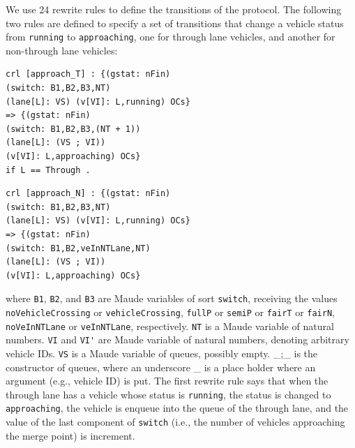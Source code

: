 \documentclass[10pt, conference, compsocconf]{IEEEtran}
\begin{document}
We use 24 rewrite rules to define the transitions of the protocol.
The following two rules are defined to specify a set of transitions that
change a vehicle status from \verb!running! to \verb!approaching!, one for through lane vehicles, and another for non-through lane vehicles: 

\begin{small}
\begin{verbatim}
crl [approach_T] : {(gstat: nFin) 
(switch: B1,B2,B3,NT) 
(lane[L]: VS) (v[VI]: L,running) OCs} 
=> {(gstat: nFin) 
(switch: B1,B2,B3,(NT + 1)) 
(lane[L]: (VS ; VI)) 
(v[VI]: L,approaching) OCs} 
if L == Through .
\end{verbatim}
\end{small}
\begin{small}
\begin{verbatim}
crl [approach_N] : {(gstat: nFin) 
(switch: B1,B2,B3,NT) 
(lane[L]: VS) (v[VI]: L,running) OCs} 
=> {(gstat: nFin) 
(switch: B1,B2,veInNTLane,NT) 
(lane[L]: (VS ; VI)) 
(v[VI]: L,approaching) OCs} 
\end{verbatim}
\end{small}

\noindent 
where \verb!B1!, \verb!B2!, and \verb!B3! are Maude variables of sort \verb!switch!, receiving the values \verb!noVehicleCrossing! or \verb!vehicleCrossing!, \verb!fullP! or \verb!semiP! or \verb!fairT! or \verb!fairN!, \verb!noVeInNTLane! or \verb!veInNTLane!, respectively.
\verb!NT! is a Maude variable of natural numbers.
\verb!VI! and \verb!VI'! are Maude variable of natural numbers, denoting arbitrary vehicle IDs. 
\verb!VS! is a Maude variable of queues, possibly empty.
\_;\_ is the constructor of queues, where an underscore \_ is
a place holder where an argument (e.g., vehicle ID) is put. 
The first rewrite rule says that when the through lane has a vehicle whose status is \verb!running!, the status is changed to \verb!approaching!, the vehicle is enqueue into the queue of the through lane, and the value of the last component of \verb!switch! (i.e., the number of vehicles approaching the merge point) is increment.
%
\end{document}
